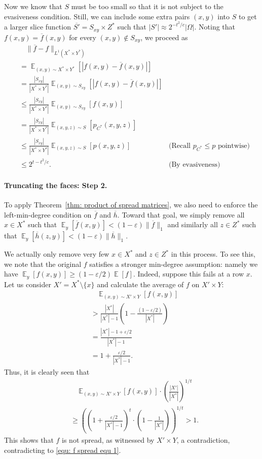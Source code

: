 \documentclass[11pt]{article}
\DeclareMathOperator*{\E}{\mathbb{E}}
\newcommand{\1}{ \mathbbm{1}}
\newcommand{\eps}{\varepsilon}
\begin{document}
Now we know that $S$ must be too small so that it is not subject to the evasiveness condition. Still, we can include some extra pairs $(x,y)$ into $S$ to get a larger slice function $\overline{S'} = S_{xy}\times Z^*$ such that $|S'|\approx 2^{-t^2/c}|\Omega|$. Noting that $f(x,y) = \overline{f}(x,y)$ for every $(x,y)\notin S_{xy}$, we proceed as
$$
\begin{aligned}
&~~~~ \| \overline{f} - f \|_{L^1(X^*\times Y^*)} \\
&= \E_{(x,y)\sim X^*\times Y^*}[|f(x,y) - \overline{f}(x,y)|] \\
&= \frac{|S_{xy}|}{|X^*\times Y^*|} \E_{(x,y)\sim S_{xy}}[|f(x,y) -\overline{f}(x,y)|] \\
&\le \frac{|S_{xy}|}{|X^*\times Y^*|} \E_{(x,y)\sim S_{xy}}[f(x,y)] \\
&= \frac{|S_{xy}|}{|X^*\times Y^*|} \E_{(x,y,z)\sim S}[p_{C^*}(x,y,z)]  \\
&\le \frac{|S_{xy}|}{|X^*\times Y^*|} \E_{(x,y,z)\sim S}[p(x,y,z)] 
& \text{(Recall $p_{C^*} \le p$ pointwise)} \\
&\le 2^{t-t^2/c}. 
& \text{(By evasiveness)}
\end{aligned}
$$
\paragraph*{Truncating the faces: Step 2.} To apply Theorem~\ref{thm: product of spread matrices}, we also need to enforce the left-min-degree condition on $\overline{f}$ and $\overline{h}$. Toward that goal, we simply remove all $x\in X^*$ such that $\E_{y}[\overline{f}(x,y)] < (1-\eps)\|\overline{f}\|_1$ and similarly all $z\in Z^*$ such that $\E_y[\overline{h}(z,y)] < (1-\eps) \|\overline{h}\|_1$.

We actually only remove very few $x\in X^*$ and $z\in Z^*$ in this process. To see this, we note that the original $f$ satisfies a stronger min-degree assumption: namely we have $\E_y[f(x,y)] \ge (1-\eps/2)\E[f]$. Indeed, suppose this fails at a row $x$. Let us consider $X' = X^*\setminus \{x\}$ and calculate the average of $f$ on $X'\times Y$:
\begin{align*}
    &~~~~ \E_{(x,y)\sim X'\times Y}[f(x,y)]  \\
    &> \frac{|X^*|}{|X^*| - 1} \left( 1 - \frac{(1-\eps/2)}{|X^*|}  \right) \\
    &= \frac{|X^*|-1+\eps/2}{|X^*| - 1} \\
    &= 1 + \frac{\eps/2}{|X^*|-1}.
\end{align*}
Thus, it is clearly seen that
\begin{align*}
    &~~~~ \E_{(x,y)\sim X'\times Y}[f(x,y)] \cdot \left( \frac{|X'|}{|X^*|} \right)^{1/t} \\
    & \ge \left( \left( 1 + \frac{\eps/2}{|X^*|-1} \right)^{t} \cdot \left( 1- \frac{1}{|X^*|} \right) \right)^{1/t} > 1.
\end{align*}
This shows that $f$ is not spread, as witnessed by $X'\times Y$, a contradiction, contradicting to \eqref{equ: f spread equ 1}.
\end{document}
